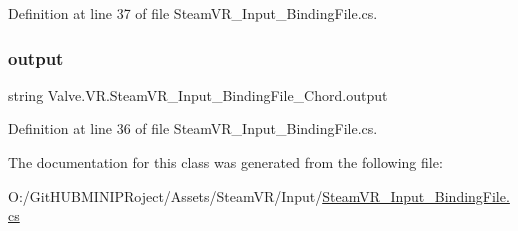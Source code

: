 Definition at line 37 of file Steam\+V\+R\+\_\+\+Input\+\_\+\+Binding\+File.\+cs.

\mbox{\label{class_valve_1_1_v_r_1_1_steam_v_r___input___binding_file___chord_a124cdb6228c17449bfef66a87721c27e}} 
\subsubsection{\texorpdfstring{output}{output}}
{\footnotesize\ttfamily string Valve.\+V\+R.\+Steam\+V\+R\+\_\+\+Input\+\_\+\+Binding\+File\+\_\+\+Chord.\+output}



Definition at line 36 of file Steam\+V\+R\+\_\+\+Input\+\_\+\+Binding\+File.\+cs.



The documentation for this class was generated from the following file\+:\begin{DoxyCompactItemize}
\item 
O\+:/\+Git\+H\+U\+B\+M\+I\+N\+I\+P\+Roject/\+Assets/\+Steam\+V\+R/\+Input/\mbox{\hyperlink{_steam_v_r___input___binding_file_8cs}{Steam\+V\+R\+\_\+\+Input\+\_\+\+Binding\+File.\+cs}}\end{DoxyCompactItemize}
